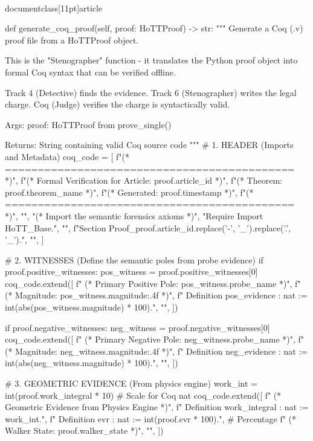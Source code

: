 \\documentclass[11pt]{article}
\begin{document}
\begin{CodeBlock}
    def generate_coq_proof(self, proof: HoTTProof) -> str:
        """
        Generate a Coq (.v) proof file from a HoTTProof object.

        This is the "Stenographer" function - it translates the Python
        proof object into formal Coq syntax that can be verified offline.

        Track 4 (Detective) finds the evidence.
        Track 6 (Stenographer) writes the legal charge.
        Coq (Judge) verifies the charge is syntactically valid.

        Args:
            proof: HoTTProof from prove_single()

        Returns:
            String containing valid Coq source code
        """
        # 1. HEADER (Imports and Metadata)
        coq_code = [
            f"(* ============================================ *)",
            f"(* Formal Verification for Article: {proof.article_id} *)",
            f"(* Theorem: {proof.theorem_name} *)",
            f"(* Generated: {proof.timestamp} *)",
            f"(* ============================================ *)",
            "",
            "(* Import the semantic forensics axioms *)",
            "Require Import HoTT_Base.",
            "",
            f"Section Proof_{proof.article_id.replace('-', '_').replace('.', '_')}.",
            "",
        ]

        # 2. WITNESSES (Define the semantic poles from probe evidence)
        if proof.positive_witnesses:
            pos_witness = proof.positive_witnesses[0]
            coq_code.extend([
                f"  (* Primary Positive Pole: {pos_witness.probe_name} *)",
                f"  (* Magnitude: {pos_witness.magnitude:.4f} *)",
                f"  Definition pos_evidence : nat := {int(abs(pos_witness.magnitude) * 100)}.",
                "",
            ])

        if proof.negative_witnesses:
            neg_witness = proof.negative_witnesses[0]
            coq_code.extend([
                f"  (* Primary Negative Pole: {neg_witness.probe_name} *)",
                f"  (* Magnitude: {neg_witness.magnitude:.4f} *)",
                f"  Definition neg_evidence : nat := {int(abs(neg_witness.magnitude) * 100)}.",
                "",
            ])

        # 3. GEOMETRIC EVIDENCE (From physics engine)
        work_int = int(proof.work_integral * 10)  # Scale for Coq nat
        coq_code.extend([
            f"  (* Geometric Evidence from Physics Engine *)",
            f"  Definition work_integral : nat := {work_int}.",
            f"  Definition evr : nat := {int(proof.evr * 100)}.",  # Percentage
            f"  (* Walker State: {proof.walker_state} *)",
            "",
        ])


\end{CodeBlock}
\end{document}

